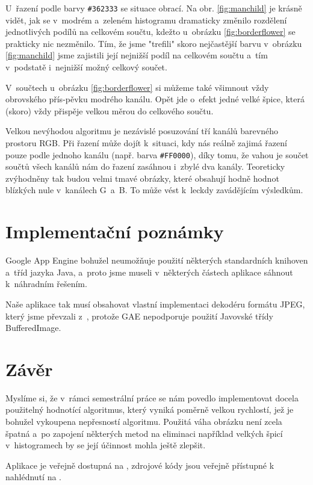 \documentclass[12pt,oneside,a4paper]{article}
\begin{document}
U~řazení podle barvy \verb|#362333| se situace obrací. Na obr. \ref{fig:manchild} je krásně vidět, jak se v~modrém a~zeleném histogramu dramaticky změnilo rozdělení jednotlivých podílů na celkovém součtu, kdežto u~obrázku \ref{fig:borderflower} se prakticky nic nezměnilo. Tím, že jsme "trefili" skoro nejčastější barvu v~obrázku \ref{fig:manchild} jsme zajistili její nejnižší podíl na celkovém součtu a~tím v~podstatě i~nejnižší možný celkový součet.

V~součtech u~obrázku \ref{fig:borderflower} si můžeme také všimnout vždy obrovského přís-pěvku modrého kanálu. Opět jde o~efekt jedné velké špice, která (skoro) vždy přispěje velkou měrou do celkového součtu.

Velkou nevýhodou algoritmu je nezávislé posuzování tří kanálů barevného prostoru RGB. Při řazení může dojít k~situaci, kdy nás reálně zajimá řazení pouze podle jednoho kanálu (např. barva \verb|#FF0000|), díky tomu, že vahou je součet součtů všech kanálů nám do řazení zasáhnou i~zbylé dva kanály. Teoreticky zvýhodněny tak budou velmi tmavé obrázky, které obsahují hodně hodnot blízkých nule v~kanálech G~a~B. To může vést k~leckdy zavádějícím výsledkům.

\section{Implementační poznámky}

Google App Engine bohužel neumožňuje použití některých standardních knihoven a~tříd jazyka Java, a~proto jsme museli v~některých částech aplikace sáhnout k~náhradním řešením.

Naše aplikace tak musí obsahovat vlastní implementaci dekodéru formátu JPEG, který jsme převzali z~\cite{Dersch}, protože GAE nepodporuje použití Javovské třídy BufferedImage.

\section{Závěr}

Myslíme si, že v~rámci semestrální práce se nám povedlo implementovat docela použitelný hodnotící algoritmus, který vyniká poměrně velkou rychlostí, jež je bohužel vykoupena nepřesností algoritmu. Použitá váha obrázku není zcela špatná a~po zapojení některých metod na eliminaci například velkých špicí v~histogramech by se její účinnost mohla ještě zlepšit.

Aplikace je veřejně dostupná na \cite{liveApp}, zdrojové kódy jsou veřejně přístupné k nahlédnutí na \cite{official}.

\renewcommand{\refname}{Literatura}

{
 
}
\end{document}
